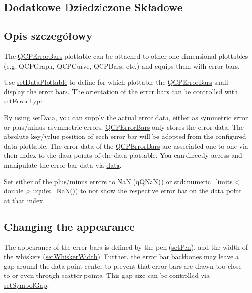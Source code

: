 \subsection*{Dodatkowe Dziedziczone Składowe}


\subsection{Opis szczegółowy}


The \hyperlink{class_q_c_p_error_bars}{Q\+C\+P\+Error\+Bars} plottable can be attached to other one-\/dimensional plottables (e.\+g. \hyperlink{class_q_c_p_graph}{Q\+C\+P\+Graph}, \hyperlink{class_q_c_p_curve}{Q\+C\+P\+Curve}, \hyperlink{class_q_c_p_bars}{Q\+C\+P\+Bars}, etc.) and equips them with error bars.

Use \hyperlink{class_q_c_p_error_bars_aabb42a964cfbf780cd1c79850c7cd989}{set\+Data\+Plottable} to define for which plottable the \hyperlink{class_q_c_p_error_bars}{Q\+C\+P\+Error\+Bars} shall display the error bars. The orientation of the error bars can be controlled with \hyperlink{class_q_c_p_error_bars_af0af493d454a8f3a0908830160680d2b}{set\+Error\+Type}.

By using \hyperlink{class_q_c_p_error_bars_a92b1980003255f5f7c05407a4d92aabc}{set\+Data}, you can supply the actual error data, either as symmetric error or plus/minus asymmetric errors. \hyperlink{class_q_c_p_error_bars}{Q\+C\+P\+Error\+Bars} only stores the error data. The absolute key/value position of each error bar will be adopted from the configured data plottable. The error data of the \hyperlink{class_q_c_p_error_bars}{Q\+C\+P\+Error\+Bars} are associated one-\/to-\/one via their index to the data points of the data plottable. You can directly access and manipulate the error bar data via \hyperlink{class_q_c_p_error_bars_ade69711ef3f9ec10e77d121fa2ba773b}{data}.

Set either of the plus/minus errors to NaN ({\ttfamily q\+Q\+Na\+N()} or {\ttfamily std\+::numeric\+\_\+limits$<$double$>$\+::quiet\+\_\+\+Na\+N()}) to not show the respective error bar on the data point at that index.\hypertarget{class_q_c_p_error_bars_qcperrorbars-appearance}{}\subsection{Changing the appearance}\label{class_q_c_p_error_bars_qcperrorbars-appearance}
The appearance of the error bars is defined by the pen (\hyperlink{class_q_c_p_abstract_plottable_ab74b09ae4c0e7e13142fe4b5bf46cac7}{set\+Pen}), and the width of the whiskers (\hyperlink{class_q_c_p_error_bars_ad05f6ff9e46c6047f1cd2459744b7b59}{set\+Whisker\+Width}). Further, the error bar backbones may leave a gap around the data point center to prevent that error bars are drawn too close to or even through scatter points. This gap size can be controlled via \hyperlink{class_q_c_p_error_bars_a280ee8d863d8a2630c309701d019b3de}{set\+Symbol\+Gap}. 

